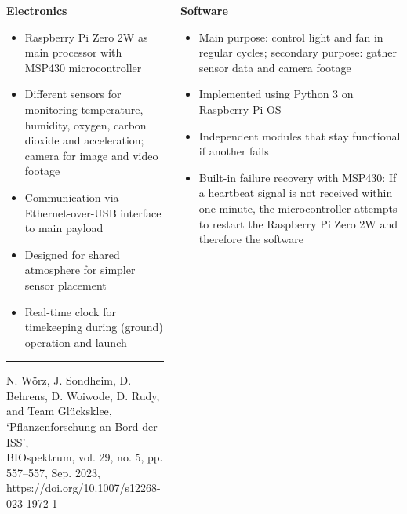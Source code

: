 \documentclass[english,final,20pt,leqno,print]{beamer}
\begin{document}
\begin{frame}[t]
\begin{columns}[T]
\begin{column}{.49\textwidth}
\begin{block}{\strut{}\textbf{Electronics}}
    \begin{itemize}
        \item Raspberry Pi Zero 2W as main processor with MSP430 microcontroller
        \item Different sensors for monitoring temperature, humidity, oxygen, carbon dioxide and acceleration; camera for image and video footage
        \item Communication via Ethernet-over-USB interface to main payload
        \item Designed for shared atmosphere for simpler sensor placement
        \item Real-time clock for timekeeping during (ground) operation and launch
    \end{itemize}
     
    \vspace{3.2em}
    \hrule
    
    \begin{thebibliography}{99}
       N. Wörz, J. Sondheim, D. Behrens, D. Woiwode, D. Rudy, and Team Glücksklee, ‘Pflanzenforschung an Bord der ISS’, \\BIOspektrum, vol. 29, no. 5, pp. 557–557, Sep. 2023, https://doi.org/10.1007/s12268-023-1972-1
    \end{thebibliography}
    \end{block}    
\end{column}

\begin{column}{.49\textwidth}

  \begin{block}{\strut{}\textbf{Software}}
  \begin{itemize}
    \item Main purpose: control light and fan in regular cycles; secondary purpose: gather sensor data and camera footage
    \item Implemented using Python 3 on Raspberry Pi OS
    \item Independent modules that stay functional if another fails
    \item Built-in failure recovery with MSP430: If a heartbeat signal is not received within one minute, the microcontroller attempts to restart the Raspberry Pi Zero 2W and therefore the software
  \end{itemize}
  \end{block}



\end{column}
\end{columns}
\end{frame}
\end{document}
